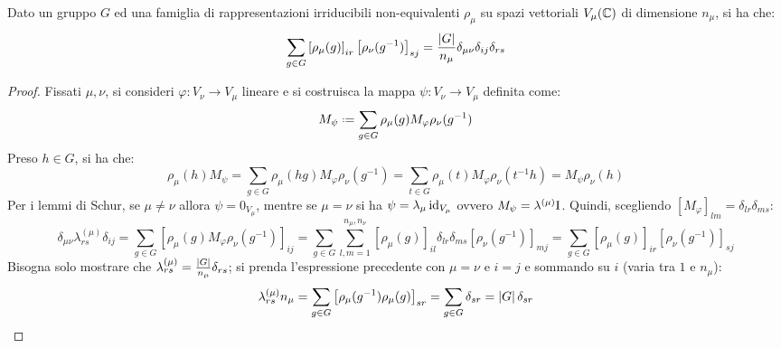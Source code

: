 \begin{theorem}
	Dato un gruppo $ G $ ed una famiglia di rappresentazioni irriducibili non-equivalenti $ \rho_{\mu} $ su spazi vettoriali $ V_{\mu}(\mathbb{C}) $ di dimensione $ n_{\mu} $, si ha che:
	\begin{equation}
		\sum_{g \in G} \left[ \rho_{\mu}(g) \right]_{ir} \left[ \rho_{\nu}(g^{-1}) \right]_{sj} = \frac{\left\lvert G\right\rvert}{n_{\mu}} \delta_{\mu \nu} \delta_{ij} \delta_{rs}
		\label{eq:8.9}
	\end{equation}
\end{theorem}
\begin{proof}
	Fissati $ \mu,\nu $, si consideri $ \varphi : V_{\nu} \rightarrow V_{\mu} $ lineare e si costruisca la mappa $ \psi : V_{\nu} \rightarrow V_{\mu} $ definita come:
	\begin{equation*}
		M_{\psi} \defeq \sum_{g \in G} \rho_{\mu}(g) M_{\varphi} \rho_{\nu}(g^{-1})
	\end{equation*}
	Preso $ h \in G $, si ha che:
	\begin{equation*}
		\rho_{\mu}(h) M_{\psi} = \sum_{g \in G} \rho_{\mu}(hg) M_{\varphi} \rho_{\nu}(g^{-1}) = \sum_{t \in G} \rho_{\mu}(t) M_{\varphi} \rho_{\nu}(t^{-1}h) = M_{\psi} \rho_{\nu}(h)
	\end{equation*}
	Per i lemmi di Schur, se $ \mu \neq \nu $ allora $ \psi = 0_{V_{\mu}} $, mentre se $ \mu = \nu $ si ha $ \psi = \lambda_{\mu} \operatorname{id}_{V_{\mu}} $ ovvero $ M_{\psi} = \lambda^{(\mu)} \mathrm{I} $. Quindi, scegliendo $ \left[ M_{\varphi} \right]_{lm} = \delta_{lr}\delta_{ms} $:
	\begin{equation*}
		\delta_{\mu \nu} \lambda^{(\mu)}_{rs} \delta_{ij} = \sum_{g \in G} \left[ \rho_{\mu}(g) M_{\varphi} \rho_{\nu}(g^{-1}) \right]_{ij} = \sum_{g \in G} \sum_{l,m = 1}^{n_{\mu},n_{\nu}} \left[ \rho_{\mu}(g) \right]_{il} \delta_{lr} \delta_{ms} \left[ \rho_{\nu}(g^{-1}) \right]_{mj} = \sum_{g \in G} \left[ \rho_{\mu}(g) \right]_{ir} \left[ \rho_{\nu}(g^{-1}) \right]_{sj}
	\end{equation*}
	Bisogna solo mostrare che $ \lambda^{(\mu)}_{rs} = \frac{\left\lvert G\right\rvert}{n_{\mu}} \delta_{rs} $; si prenda l'espressione precedente con $ \mu = \nu $ e $ i = j $ e sommando su $ i $ (varia tra $ 1 $ e $ n_{\mu} $):
	\begin{equation*}
		\lambda^{(\mu)}_{rs} n_{\mu} = \sum_{g \in G} \left[ \rho_{\mu}(g^{-1}) \rho_{\mu}(g) \right]_{sr} = \sum_{g \in G} \delta_{sr} = \left\lvert G\right\rvert \delta_{sr}
	\end{equation*}
\end{proof}


